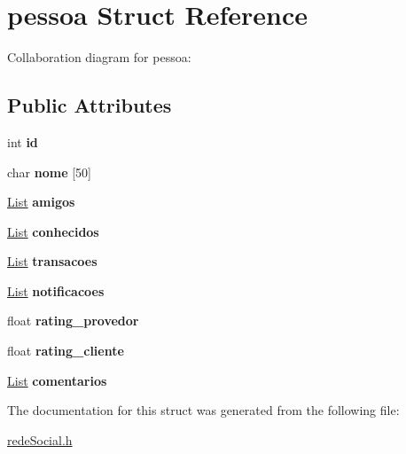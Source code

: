 \hypertarget{structpessoa}{}\section{pessoa Struct Reference}
\label{structpessoa}


Collaboration diagram for pessoa\+:
\subsection*{Public Attributes}
\begin{DoxyCompactItemize}
\item 
\mbox{\label{structpessoa_a8e80bd7d70d7d29b248ef5ec77720b5b}} 
int {\bfseries id}
\item 
\mbox{\label{structpessoa_aab3d539801c72b8740e5467b0cf86839}} 
char {\bfseries nome} \mbox{[}50\mbox{]}
\item 
\mbox{\label{structpessoa_a4eea379bf9c4b63980b2b7b9eb5523cb}} 
\hyperlink{lista_8h_a698ff83165b8296011a50bb9aba83964}{List} {\bfseries amigos}
\item 
\mbox{\label{structpessoa_a4a0912ceba3d7877996a51dcfd373ce8}} 
\hyperlink{lista_8h_a698ff83165b8296011a50bb9aba83964}{List} {\bfseries conhecidos}
\item 
\mbox{\label{structpessoa_ad9d343133c3f26aaad1b8e2656235b3d}} 
\hyperlink{lista_8h_a698ff83165b8296011a50bb9aba83964}{List} {\bfseries transacoes}
\item 
\mbox{\label{structpessoa_a62d9fd43b7e6149b1ad85c7bb1ffa5c4}} 
\hyperlink{lista_8h_a698ff83165b8296011a50bb9aba83964}{List} {\bfseries notificacoes}
\item 
\mbox{\label{structpessoa_a6aef9f983e1a00eb20e0b4227df8e963}} 
float {\bfseries rating\+\_\+provedor}
\item 
\mbox{\label{structpessoa_afee04df44de2997fa213bbdc1a24a5c0}} 
float {\bfseries rating\+\_\+cliente}
\item 
\mbox{\label{structpessoa_a04fa228b9b6f71210dae022b62fd5fab}} 
\hyperlink{lista_8h_a698ff83165b8296011a50bb9aba83964}{List} {\bfseries comentarios}
\end{DoxyCompactItemize}


The documentation for this struct was generated from the following file\+:\begin{DoxyCompactItemize}
\item 
\hyperlink{rede_social_8h}{rede\+Social.\+h}\end{DoxyCompactItemize}
